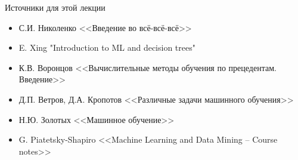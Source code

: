 \documentclass[compress,red,unicode]{beamer}
\begin{document}
\begin{frame}{Источники для этой лекции}
\begin{itemize}
	\item С.И. Николенко <<Введение во всё-всё-всё>>
	\item E. Xing "Introduction to ML and decision trees"
 	\item К.В. Воронцов <<Вычислительные методы обучения по прецедентам. Введение>>
 	\item Д.П. Ветров, Д.А. Кропотов <<Различные задачи машинного обучения>>
	\item Н.Ю. Золотых <<Машинное обучение>>
	\item G. Piatetsky-Shapiro <<Machine Learning and Data Mining -- Course notes>>

\end{itemize}
\end{frame}
\end{document}
